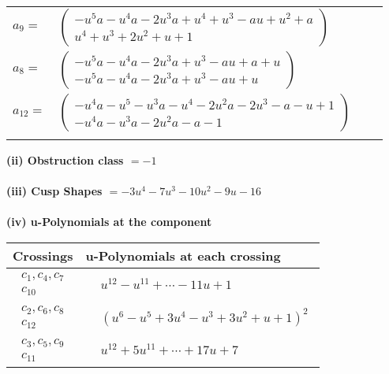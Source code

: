 \documentclass[1p]{elsarticle_modified}
\theoremstyle{definition}
\begin{document}
\begin{tabular}{m{7pt} m{180pt} m{7pt} m{180pt} }
\flushright $a_{9}=$&$\begin{pmatrix}- u^5 a- u^4 a-2 u^3 a+u^4+u^3- a u+u^2+a\\u^4+u^3+2 u^2+u+1\end{pmatrix}$ \\
\flushright $a_{8}=$&$\begin{pmatrix}- u^5 a- u^4 a-2 u^3 a+u^3- a u+a+u\\- u^5 a- u^4 a-2 u^3 a+u^3- a u+u\end{pmatrix}$ \\
\flushright $a_{12}=$&$\begin{pmatrix}- u^4 a- u^5- u^3 a- u^4-2 u^2 a-2 u^3- a- u+1\\- u^4 a- u^3 a-2 u^2 a- a-1\end{pmatrix}$\\&\end{tabular}
\flushleft \textbf{(ii) Obstruction class $= -1$}\\~\\
\flushleft \textbf{(iii) Cusp Shapes $= -3 u^4-7 u^3-10 u^2-9 u-16$}\\~\\
\newpage\renewcommand{\arraystretch}{1}
\flushleft \textbf{(iv) u-Polynomials at the component}\newline \\
\begin{tabular}{m{50pt}|m{274pt}}
Crossings & \hspace{64pt}u-Polynomials at each crossing \\
\hline $$\begin{aligned}c_{1},c_{4},c_{7}\\c_{10}\end{aligned}$$&$\begin{aligned}
&u^{12}- u^{11}+\cdots-11 u+1
\end{aligned}$\\
\hline $$\begin{aligned}c_{2},c_{6},c_{8}\\c_{12}\end{aligned}$$&$\begin{aligned}
&(u^6- u^5+3 u^4- u^3+3 u^2+u+1)^2
\end{aligned}$\\
\hline $$\begin{aligned}c_{3},c_{5},c_{9}\\c_{11}\end{aligned}$$&$\begin{aligned}
&u^{12}+5 u^{11}+\cdots+17 u+7
\end{aligned}$\\
\hline
\end{tabular}\\~\\
\end{document}
